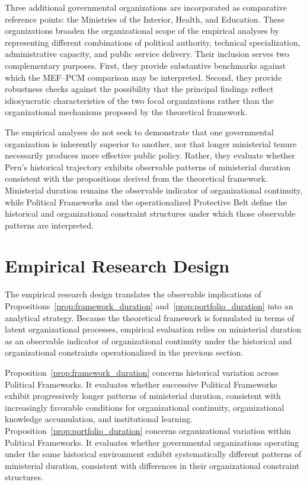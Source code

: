 \documentclass[doc, 12pt, a4paper,floatsintext]{apa7}
\begin{document}
Three additional governmental organizations are incorporated as comparative reference points: the Ministries of the Interior, Health, and Education. These organizations broaden the organizational scope of the empirical analyses by representing different combinations of political authority, technical specialization, administrative capacity, and public service delivery. Their inclusion serves two complementary purposes. First, they provide substantive benchmarks against which the MEF--PCM comparison may be interpreted. Second, they provide robustness checks against the possibility that the principal findings reflect idiosyncratic characteristics of the two focal organizations rather than the organizational mechanisms proposed by the theoretical framework.

The empirical analyses do not seek to demonstrate that one governmental organization is inherently superior to another, nor that longer ministerial tenure necessarily produces more effective public policy. Rather, they evaluate whether Peru's historical trajectory exhibits observable patterns of ministerial duration consistent with the propositions derived from the theoretical framework. Ministerial duration remains the observable indicator of organizational continuity, while Political Frameworks and the operationalized Protective Belt define the historical and organizational constraint structures under which those observable patterns are interpreted.
%
\section{Empirical Research Design}
%
The empirical research design translates the observable implications of Propositions~\ref{prop:framework_duration} and~\ref{prop:portfolio_duration} into an analytical strategy. Because the theoretical framework is formulated in terms of latent organizational processes, empirical evaluation relies on ministerial duration as an observable indicator of organizational continuity under the historical and organizational constraints operationalized in the previous section.

Proposition~\ref{prop:framework_duration} concerns historical variation across Political Frameworks. It evaluates whether successive Political Frameworks exhibit progressively longer patterns of ministerial duration, consistent with increasingly favorable conditions for organizational continuity, organizational knowledge accumulation, and institutional learning. Proposition~\ref{prop:portfolio_duration} concerns organizational variation within Political Frameworks. It evaluates whether governmental organizations operating under the same historical environment exhibit systematically different patterns of ministerial duration, consistent with differences in their organizational constraint structures.
\end{document}
